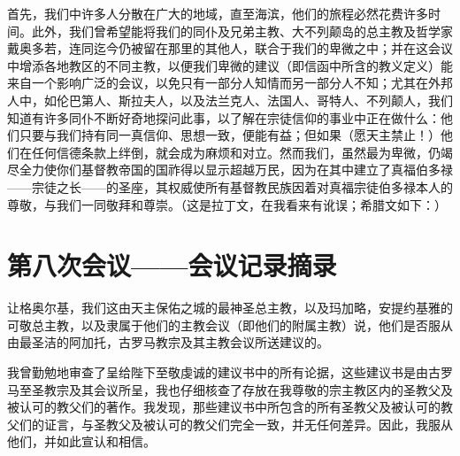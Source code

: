 \par

首先，我们中许多人分散在广大的地域，直至海滨，他们的旅程必然花费许多时间。此外，我们曾希望能将我们的同仆及兄弟主教、大不列颠岛的总主教及哲学家戴奥多若，连同迄今仍被留在那里的其他人，联合于我们的卑微之中；并在这会议中增添各地教区的不同主教，以便我们卑微的建议（即信函中所含的教义定义）能来自一个影响广泛的会议，以免只有一部分人知情而另一部分人不知；尤其在外邦人中，如伦巴第人、斯拉夫人，以及法兰克人、法国人、哥特人、不列颠人，我们知道有许多同仆不断好奇地探问此事，以了解在宗徒信仰的事业中正在做什么：他们只要与我们持有同一真信仰、思想一致，便能有益；但如果（愿天主禁止！）他们在任何信德条款上绊倒，就会成为麻烦和对立。然而我们，虽然最为卑微，仍竭尽全力使你们基督教帝国的国祚得以显示超越万民，因为在其中建立了真福伯多禄——宗徒之长——的圣座，其权威使所有基督教民族因着对真福宗徒伯多禄本人的尊敬，与我们一同敬拜和尊崇。（这是拉丁文，在我看来有讹误；希腊文如下：）\par

\par


\section{第八次会议——会议记录摘录}

\par

让格奥尔基，我们这由天主保佑之城的最神圣总主教，以及玛加略，安提约基雅的可敬总主教，以及隶属于他们的主教会议（即他们的附属主教）说，他们是否服从由最圣洁的阿加托，古罗马教宗及其主教会议所送建议的。\par

\par

我曾勤勉地审查了呈给陛下至敬虔诚的建议书中的所有论据，这些建议书是由古罗马至圣教宗及其会议所呈，我也仔细核查了存放在我尊敬的宗主教区内的圣教父及被认可的教父们的著作。我发现，那些建议书中所包含的所有圣教父及被认可的教父们的证言，与圣教父及被认可的教父们完全一致，并无任何差异。因此，我服从他们，并如此宣认和相信。\par

